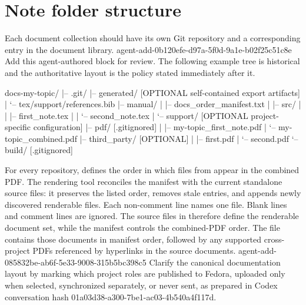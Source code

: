 \section*{Note folder structure}
Each document collection should have its own Git repository and a corresponding entry in the document library.
\agentProposedEdit
  {agent-add-0b120efe-d97a-5f0d-9a1e-b02f25c51c8e}
  {Add this agent-authored block for review.}
  {}
  {The following example tree is historical and the authoritative layout is the policy stated immediately after it.}
\begin{DocCode}
docs-my-topic/
|-- .git/
|-- generated/ [OPTIONAL self-contained export artifacts]
|   `-- tex/support/references.bib
|-- manual/
|   |-- docs_order_manifest.txt
|   |-- src/
|   |   |-- first_note.tex
|   |   `-- second_note.tex
|   `-- support/ [OPTIONAL project-specific configuration]
|-- pdf/ [.gitignored]
|   |-- my-topic_first_note.pdf
|   `-- my-topic_combined.pdf
|-- third_party/ [OPTIONAL]
|   |-- first.pdf
|   `-- second.pdf
`-- build/ [.gitignored]
\end{DocCode}
For every  repository,  defines the order in which files from  appear in the combined PDF.
The rendering tool reconciles the manifest with the current standalone source files: it preserves the listed order, removes stale entries, and appends newly discovered renderable files.
Each non-comment line names one  file.
Blank lines and comment lines are ignored.
The source files in  therefore define the renderable document set, while the manifest controls the combined-PDF order.
The  file contains those documents in manifest order, followed by any supported cross-project PDFs referenced by hyperlinks in the source documents.
\agentProposedEdit
  {agent-add-085832be-ab6f-5e33-9008-315b5bc398c5}
  {Clarify the canonical documentation layout by marking which project roles are published to Fedora, uploaded only when selected, synchronized separately, or never sent, as prepared in Codex conversation hash 01a03d38-a300-7be1-ac03-4b540a4f117d.}
  {}
